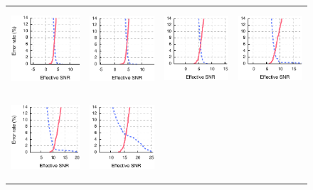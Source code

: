 \begin{figure}[p]
\begin{xtrafullpage}
\begin{tabular}{cccc}
	\midrule
	\includegraphics[height=1.2in]{figures/delivery_figures/goodbad/esnr_goodbad_8.pdf} &
	\includegraphics[height=1.2in]{figures/delivery_figures/goodbad/esnr_goodbad_9.pdf} &
	\includegraphics[height=1.2in]{figures/delivery_figures/goodbad/esnr_goodbad_10.pdf} &
	\includegraphics[height=1.2in]{figures/delivery_figures/goodbad/esnr_goodbad_11.pdf} \\
	\includegraphics[height=1.2in]{figures/delivery_figures/goodbad/esnr_goodbad_12.pdf} &
	\includegraphics[height=1.2in]{figures/delivery_figures/goodbad/esnr_goodbad_13.pdf} &

\end{tabular}
\end{xtrafullpage}
\end{figure}
